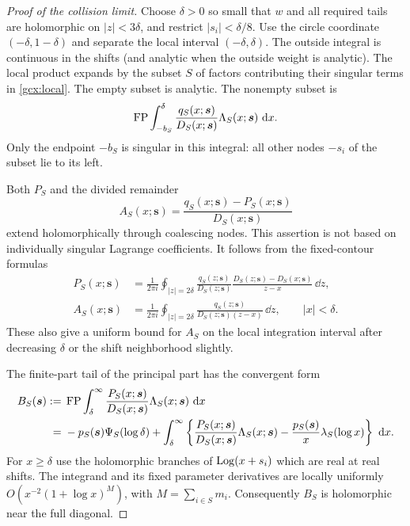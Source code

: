 \begin{proof}[Proof of the collision limit]
Choose $\delta>0$ so small that $w$ and all required tails are holomorphic
on $|z|<3\delta$, and restrict $|s_i|<\delta/8$.  Use the circle coordinate
$(-\delta,1-\delta)$ and separate the local interval
$(-\delta,\delta)$.  The outside integral is continuous in the shifts
(and analytic when the outside weight is analytic).  The local product
expands by the subset $S$ of factors contributing their singular terms in
\eqref{gcx:local}.  The empty subset is analytic.  The nonempty subset is
\begin{equation}\label{gcx:local-subset}
 \operatorname{FP}\int_{-b_S}^{\delta}
        \frac{q_S(x;\boldsymbol s)}{D_S(x;\boldsymbol s)}
                  \Lambda_S(x;\boldsymbol s)\,\,\mathrm d x.
\end{equation}
Only the endpoint $-b_S$ is singular in this integral: all other nodes
$-s_i$ of the subset lie to its left.

Both $P_S$ and the divided remainder
\[
 A_S(x;\boldsymbol s)=\frac{q_S(x;\boldsymbol s)-P_S(x;\boldsymbol s)}
                           {D_S(x;\boldsymbol s)}
\]
extend holomorphically through coalescing nodes.  This assertion is not
based on individually singular Lagrange coefficients.  It follows from
the fixed-contour formulas
\begin{align}
 P_S(x;\boldsymbol s)&=\frac1{2\pi i}\oint_{|z|=2\delta}
 \frac{q_S(z;\boldsymbol s)}{D_S(z;\boldsymbol s)}
 \frac{D_S(z;\boldsymbol s)-D_S(x;\boldsymbol s)}{z-x}\,\dd z,
 \label{gcx:Hermite-contour}\\
 A_S(x;\boldsymbol s)&=\frac1{2\pi i}\oint_{|z|=2\delta}
 \frac{q_S(z;\boldsymbol s)}{D_S(z;\boldsymbol s)(z-x)}\,\dd z,
 \qquad |x|<\delta.
 \label{gcx:remainder-contour}
\end{align}
These also give a uniform bound for $A_S$ on the local integration
interval after decreasing $\delta$ or the shift neighborhood slightly.

The finite-part tail of the principal part has the convergent form
\begin{align}
 B_S(\boldsymbol s):={}&\operatorname{FP}\int_\delta^\infty
      \frac{P_S(x;\boldsymbol s)}{D_S(x;\boldsymbol s)}
                  \Lambda_S(x;\boldsymbol s)\,\,\mathrm d x\notag\\
 ={}&-p_S(\boldsymbol s)\Psi_S(\log\delta)
 +\int_\delta^\infty\left\{
      \frac{P_S(x;\boldsymbol s)}{D_S(x;\boldsymbol s)}
                    \Lambda_S(x;\boldsymbol s)
       -\frac{p_S(\boldsymbol s)}x\lambda_S(\log x)\right\}\,\,\mathrm d x.
 \label{gcx:tail}
\end{align}
For $x\ge\delta$ use the holomorphic branches of $\operatorname{Log}(x+s_i)$ which are
real at real shifts.  The integrand and its fixed parameter derivatives
are locally uniformly $O(x^{-2}(1+\log x)^M)$, with
$M=\sum_{i\in S}m_i$.  Consequently $B_S$ is holomorphic near the full
diagonal.


\end{proof}
